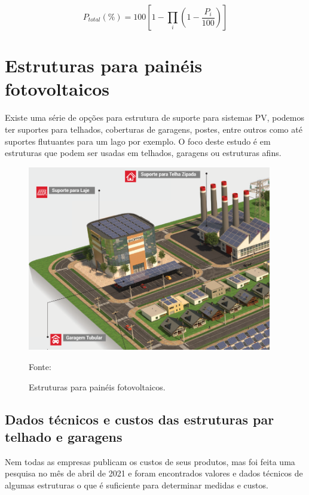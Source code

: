 \begin{equation}
    P_{total} (\%) = 100 [1 - \prod_i(1 - \frac{P_i}{100})]
    \label{eq:perdas}
\end{equation}

\newpage
\section{Estruturas para painéis fotovoltaicos}\label{estrutura}

Existe uma série de opções para estrutura de suporte para sistemas PV, podemos ter suportes para telhados, coberturas de garagens, postes, entre outros como até suportes flutuantes para um lago por exemplo. O foco deste estudo é em estruturas que podem ser usadas em telhados, garagens ou estruturas afins.

\begin{figure}[H]
    \centering
    \includegraphics[width=0.95\textwidth]{./Figuras/estruturas.png}
    \caption{Estruturas para painéis fotovoltaicos.}{Fonte: \cite{romagnole}}
   \label{fig:estruturas}
\end{figure}

\subsection{Dados técnicos e custos das estruturas par telhado e garagens}

Nem todas as empresas publicam os custos de seus produtos, mas foi feita uma pesquisa no mês de abril de 2021 e foram encontrados valores e dados técnicos de algumas estruturas o que é suficiente para determinar medidas e custos.

